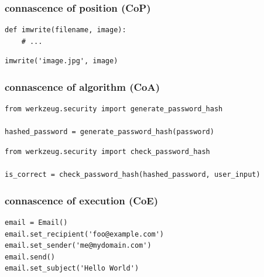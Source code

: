 \documentclass[aspectratio=169,12pt,xcolor=dvipsnames]{beamer}
\begin{document}
\begin{frame}[fragile]
  \frametitle{connascence of position (CoP)}
  \begin{center}
    \begin{minipage}[c]{.5\textwidth}
      \begin{verbatim}
def imwrite(filename, image):
    # ...
      \end{verbatim}
    \end{minipage}
    \begin{minipage}[c]{.5\textwidth}
      \begin{verbatim}
imwrite('image.jpg', image)
      \end{verbatim}
    \end{minipage}
  \end{center}
\end{frame}

\begin{frame}[fragile]
  \frametitle{connascence of algorithm (CoA)}
  \begin{center}
    \begin{minipage}[c]{.98\textwidth}
      \begin{verbatim}
from werkzeug.security import generate_password_hash

hashed_password = generate_password_hash(password)
      \end{verbatim}
    \end{minipage}
    \begin{minipage}[c]{.98\textwidth}
      \begin{verbatim}
from werkzeug.security import check_password_hash

is_correct = check_password_hash(hashed_password, user_input)
      \end{verbatim}
    \end{minipage}
  \end{center}
\end{frame}

\begin{frame}[fragile]
  \frametitle{connascence of execution (CoE)}
  \begin{center}
    \begin{minipage}[c]{.6\textwidth}
      \begin{verbatim}
email = Email()
email.set_recipient('foo@example.com')
email.set_sender('me@mydomain.com')
email.send()
email.set_subject('Hello World')
      \end{verbatim}
    \end{minipage}
  \end{center}
\end{frame}
\end{document}
